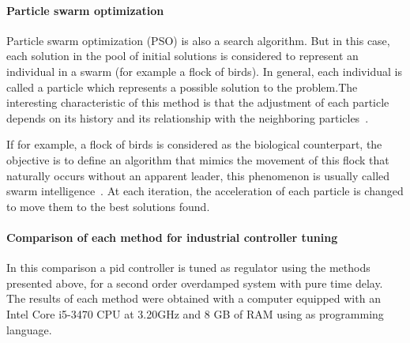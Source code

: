 \paragraph{Particle swarm optimization}
Particle swarm optimization (PSO) is also a search algorithm. But in this case, each solution in the pool of initial solutions is considered to represent an individual in a swarm (for example a flock of birds). In general, each individual is called a particle which represents a possible solution to the problem.The interesting characteristic of this method is that the adjustment of each particle depends on its history and its relationship with the neighboring particles~\citep{Shi2004}.

If for example, a flock of birds is considered as the biological counterpart, the objective is to define an algorithm that mimics the movement of this flock that naturally occurs without an apparent leader, this phenomenon is usually called swarm intelligence~\citep{Kennedy1995}. At each iteration, the acceleration of each particle is changed to move them to the best solutions found.

\paragraph{Comparison of each method for industrial controller tuning}
%
In this comparison a \gls{pid} controller is tuned as regulator using the methods presented above, for a second order overdamped system with pure time delay. The results of each method were obtained with a computer equipped with an Intel Core i5-3470 CPU at 3.20GHz and 8 GB of RAM using \matlab as programming language.

